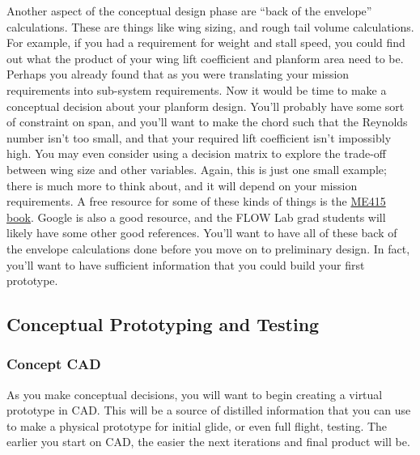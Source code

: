 \documentclass[report]{byu-aero}
\begin{document}
Another aspect of the conceptual design phase are ``back of the envelope'' calculations. These are things like wing sizing, and rough tail volume calculations. For example, if you had a requirement for weight and stall speed, you could find out what the product of your wing lift coefficient and planform area need to be.  Perhaps you already found that as you were translating your mission requirements into sub-system requirements. Now it would be time to make a conceptual decision about your planform design. You'll probably have some sort of constraint on span, and you'll want to make the chord such that the Reynolds number isn't too small, and that your required lift coefficient isn't impossibly high. You may even consider using a decision matrix to explore the trade-off between wing size and other variables. Again, this is just one small example; there is much more to think about, and it will depend on your mission requirements. A free resource for some of these kinds of things is the \href{https://byu.app.box.com/v/me415book}{ME415 book}. Google is also a good resource, and the FLOW Lab grad students will likely have some other good references. You'll want to have all of these back of the envelope calculations done before you move on to preliminary design. In fact, you'll want to have sufficient information that you could build your first prototype.

\subsection{Conceptual Prototyping and Testing}

\subsubsection{Concept CAD}
As you make conceptual decisions, you will want to begin creating a virtual prototype in CAD. This will be a source of distilled information that you can use to make a physical prototype for initial glide, or even full flight, testing. The earlier you start on CAD, the easier the next iterations and final product will be.
\end{document}
